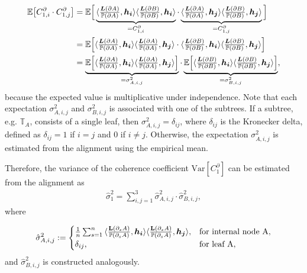 \begin{align*}
\mathbb{E}\big[C_{1,i}^\partial\cdot C_{1,j}^\partial\big] &= \mathbb{E}\Big[\underbrace{\langle \tfrac{{ \bm{L}(\partial A) }}{\mathbb{P}({\partial A})},\bm{h_i}\rangle \langle \tfrac{{ \bm{L}(\partial B) }}{\mathbb{P}({\partial B})}, \bm{h_i}\rangle}_{=C_{1,i}^\partial} \cdot \underbrace{\langle \tfrac{{ \bm{L}(\partial A) }}{\mathbb{P}({\partial A})},\bm{h_j}\rangle \langle \tfrac{{ \bm{L}(\partial B) }}{\mathbb{P}({\partial B})}, \bm{h_j}\rangle}_{= C_{1,j}^\partial} \Big]\\
&=\mathbb{E}\Big[\langle \tfrac{{ \bm{L}(\partial A) }}{\mathbb{P}({\partial A})},\bm{h_i}\rangle  \langle \tfrac{{ \bm{L}(\partial A) }}{\mathbb{P}({\partial A})},\bm{h_j}\rangle \cdot \langle \tfrac{{ \bm{L}(\partial B) }}{\mathbb{P}({\partial B})}, \bm{h_i}\rangle\langle \tfrac{{ \bm{L}(\partial B) }}{\mathbb{P}({\partial B})}, \bm{h_j}\rangle \Big]\\
&=\underbrace{\mathbb{E}\Big[\langle \tfrac{{ \bm{L}(\partial A) }}{\mathbb{P}({\partial A})},\bm{h_i}\rangle  \langle \tfrac{{ \bm{L}(\partial A) }}{\mathbb{P}({\partial A})},\bm{h_j}\rangle \Big]}_{=\sigma^2_{A,i,j}}\cdot \underbrace{\mathbb{E}\Big[ \langle \tfrac{{ \bm{L}(\partial B) }}{\mathbb{P}({\partial B})}, \bm{h_i}\rangle\langle \tfrac{{ \bm{L}(\partial B) }}{\mathbb{P}({\partial B})}, \bm{h_j}\rangle \Big]}_{=\sigma^2_{B,i,j}},
\end{align*}
because the expected value is multiplicative under independence. Note that each expectation $\sigma^2_{A,i,j}$ and $\sigma^2_{B,i,j}$ is associated with one of the subtrees. 
If a subtree, e.g. $\mathbb{T}_A$, consists of a single leaf, then $\sigma^2_{A,i,j}=\delta_{ij}$, where $\delta_{ij}$ is the Kronecker delta, defined as $\delta_{ij} = 1$ if $i=j$ and $0$ if $i \neq j$. Otherwise, the expectation $\sigma^2_{A,i,j}$ is estimated from the alignment using the empirical mean. 

\medskip

Therefore, the variance of the coherence coefficient  $\mathrm{Var}[C^\partial_1]$ can be estimated from the alignment as
\begin{align}\label{variance_estimate}
\hat\sigma_1^2= \sum_{i,j=1}^3 \hat\sigma^2_{A,i,j}\cdot \hat\sigma^2_{B,i,j}, 
\end{align}
where

\begin{align*}
    \hat{\sigma}^2_{A,i,j} :=
    \begin{cases}
    \frac{1}{n}\sum_{s=1}^n \,\langle \tfrac{\mathbf{L}(\partial_sA)}{\mathbb{P}(\partial_sA)},\bm{h_i}\rangle\langle \tfrac{\mathbf{L}(\partial_sA)}{\mathbb{P}(\partial_sA)},\bm{h_j}\rangle,  & \text{for internal node A},\\
    \delta_{ij},&  \text{for leaf A},
    \end{cases}
\end{align*}
and $\hat{\sigma}^2_{B,i,j}$ is constructed analogously.

